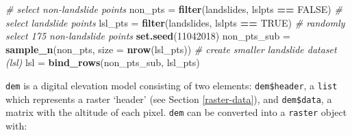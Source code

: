 \documentclass[]{krantz}
\newenvironment{Shaded}{\begin{snugshade}}{\end{snugshade}}
\newcommand{\CommentTok}[1]{\textcolor[rgb]{0.37,0.37,0.37}{\textit{#1}}}
\newcommand{\DataTypeTok}[1]{\textcolor[rgb]{0.27,0.27,0.27}{#1}}
\newcommand{\DecValTok}[1]{\textcolor[rgb]{0.06,0.06,0.06}{#1}}
\newcommand{\KeywordTok}[1]{\textcolor[rgb]{0.27,0.27,0.27}{\textbf{#1}}}
\newcommand{\NormalTok}[1]{#1}
\newcommand{\OperatorTok}[1]{\textcolor[rgb]{0.43,0.43,0.43}{\textbf{#1}}}
\newcommand{\OtherTok}[1]{\textcolor[rgb]{0.37,0.37,0.37}{#1}}
\newcommand{\StringTok}[1]{\textcolor[rgb]{0.5,0.5,0.5}{#1}}
\begin{document}
\begin{Shaded}
\begin{Highlighting}[]
\CommentTok{# select non-landslide points}
\NormalTok{non_pts =}\StringTok{ }\KeywordTok{filter}\NormalTok{(landslides, lslpts }\OperatorTok{==}\StringTok{ }\OtherTok{FALSE}\NormalTok{)}
\CommentTok{# select landslide points}
\NormalTok{lsl_pts =}\StringTok{ }\KeywordTok{filter}\NormalTok{(landslides, lslpts }\OperatorTok{==}\StringTok{ }\OtherTok{TRUE}\NormalTok{)}
\CommentTok{# randomly select 175 non-landslide points}
\KeywordTok{set.seed}\NormalTok{(}\DecValTok{11042018}\NormalTok{)}
\NormalTok{non_pts_sub =}\StringTok{ }\KeywordTok{sample_n}\NormalTok{(non_pts, }\DataTypeTok{size =} \KeywordTok{nrow}\NormalTok{(lsl_pts))}
\CommentTok{# create smaller landslide dataset (lsl)}
\NormalTok{lsl =}\StringTok{ }\KeywordTok{bind_rows}\NormalTok{(non_pts_sub, lsl_pts)}
\end{Highlighting}
\end{Shaded}

\texttt{dem} is a digital elevation model consisting of two elements:
\texttt{dem\$header}, a \texttt{list} which represents a raster `header' (see Section \ref{raster-data}), and \texttt{dem\$data}, a matrix with the altitude of each pixel.
\texttt{dem} can be converted into a \texttt{raster} object with:

\begin{Shaded}
\end{Shaded}
\end{document}
